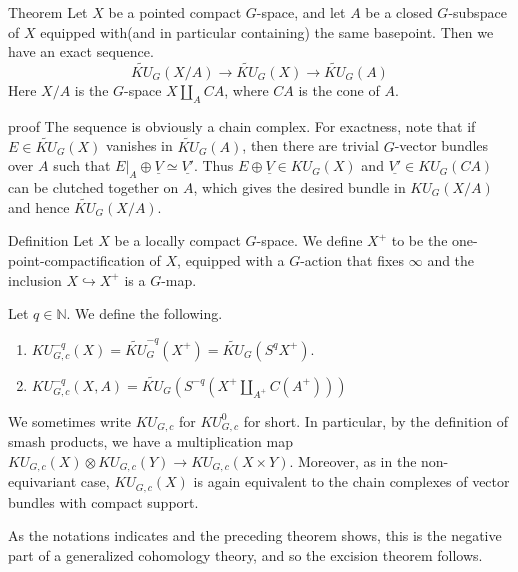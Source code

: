 \documentclass{beamer}
\newcommand{\inj}{\hookrightarrow}
\begin{document}
\begin{frame}
	\begin{alertblock}{Theorem}
		Let $X$ be a pointed compact $G$-space, and let $A$ be a closed $G$-subspace of $X$ equipped with(and in particular containing) the same basepoint. Then we have an exact sequence. 
		\[ \widetilde{KU}_G(X/A)\to\widetilde{KU}_G(X)\to\widetilde{KU}_G(A) \]
		Here $X/A$ is the $G$-space $X\amalg_{A}CA$, where $CA$ is the cone of $A$. 
	\end{alertblock}
\end{frame}

\begin{frame}
	\begin{block}{proof}
		The sequence is obviously a chain complex. For exactness, note that if $E\in\widetilde{KU}_G(X)$ vanishes in $\widetilde{KU}_G(A)$, then there are trivial $G$-vector bundles over $A$ such that $E|_A\oplus\underline{V}\simeq\underline{V'}$. Thus $E\oplus\underline{V}\in KU_G(X)$ and $\underline{V'}\in KU_G(CA)$ can be clutched together on $A$, which gives the desired bundle in $KU_G(X/A)$ and hence $\widetilde{KU}_G(X/A)$. 
	\end{block}
\end{frame}

\begin{frame}
	\begin{block}{Definition}
		Let $X$ be a locally compact $G$-space. We define $X^+$ to be the one-point-compactification of $X$, equipped with a $G$-action that fixes $\infty$ and the inclusion $X\inj X^+$ is a $G$-map. 
		
		Let $q\in\mathbb{N}$. We define the following. 
		\begin{enumerate}
			\item $KU_{G,c}^{-q}(X)=\widetilde{KU}_G^{-q}(X^+)=\widetilde{KU}_G(S^qX^+)$. 
			\item $KU_{G,c}^{-q}(X,A)=\widetilde{KU}_G(S^{-q}(X^+\amalg_{A^+}C(A^+)))$
		\end{enumerate}

		We sometimes write $KU_{G,c}$ for $KU_{G,c}^0$ for short. In particular, by the definition of smash products, we have a multiplication map $KU_{G,c}(X)\otimes KU_{G,c}(Y)\to KU_{G,c}(X\times Y)$. Moreover, as in the non-equivariant case, $KU_{G,c}(X)$ is again equivalent to the chain complexes of vector bundles with compact support. 
	\end{block}
	As the notations indicates and the preceding theorem shows, this is the negative part of a generalized cohomology theory, and so the excision theorem follows. 
\end{frame}
\end{document}
